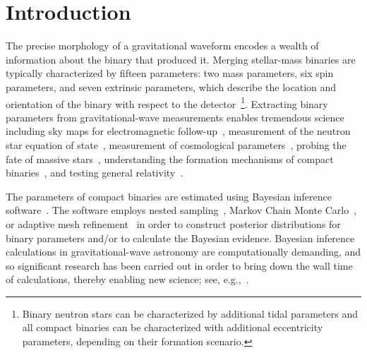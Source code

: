 \documentclass[prd,superscriptaddress,twocolumn,nopreprintnumbers,floatfix,longbibliography]{revtex4}
\begin{document}
\maketitle

\section{Introduction}
The precise morphology of a gravitational waveform encodes a wealth of information about the binary that produced it.
Merging stellar-mass binaries are typically characterized by fifteen parameters: two mass parameters, six spin parameters, and seven extrinsic parameters, which describe the location and orientation of the binary with respect to the detector~\footnote{Binary neutron stars can be characterized by additional tidal parameters and all compact binaries can be characterized with additional eccentricity parameters, depending on their formation scenario.}.
Extracting binary parameters from gravitational-wave measurements enables tremendous science including sky maps for electromagnetic follow-up~\cite{GW170817_properties,GW170817_mma}, measurement of the neutron star equation of state~\cite{GW170817_tidal}, measurement of cosmological parameters~\cite{Schutz,GW170817_Hubble}, probing the fate of massive stars~\cite{mass_uc,mass,o2pop}, understanding the formation mechanisms of compact binaries~\cite{salvo,Stevenson,spin,GerosaBerti,FarrNature,Wysocki18,eccentricity}, and testing general relativity~\cite{GW150914_gr,GRB170817A}.

The parameters of compact binaries are estimated using Bayesian inference software~\cite{lalinference,PyCBCInference,bilby,RapidPE1,RapidPE2}.
The software employs nested sampling~\cite{Skilling2004}, Markov Chain Monte Carlo~\cite{Metropolis1953,Hastings1970,Hogg}, or adaptive mesh refinement~\cite{RapidPE1,RapidPE2} in order to construct posterior distributions for binary parameters and/or to calculate the Bayesian evidence.
Bayesian inference calculations in gravitational-wave astronomy are computationally demanding, and so significant research has been carried out in order to bring down the wall time of calculations, thereby enabling new science; see, e.g.,~\cite{smith,purrer,canizares,gpu_inference,gpu_rit}.
\end{document}
